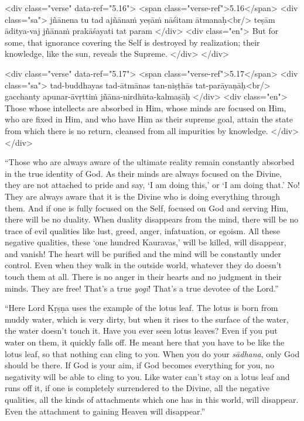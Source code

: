 \begin{html}
<div class="verse" data-ref="5.16">
  <span class="verse-ref">5.16</span>
  <div class="sa">
    jñānena tu tad ajñānaṁ yeṣāṁ nāśitam ātmanaḥ<br/>
    teṣām āditya-vaj jñānaṁ prakāśayati tat param
  </div>
  <div class="en">
    But for some, that ignorance covering the Self is destroyed by realization; their knowledge, like the sun, reveals the Supreme.
  </div>
</div>
\end{html}



\begin{html}
<div class="verse" data-ref="5.17">
  <span class="verse-ref">5.17</span>
  <div class="sa">
    tad-buddhayas tad-ātmānas tan-niṣṭhās tat-parāyaṇāḥ<br/>
    gacchanty apunar-āvṛttiṁ jñāna-nirdhūta-kalmaṣāḥ
  </div>
  <div class="en">
    Those whose intellects are absorbed in Him, whose minds are focused on Him, who are fixed in Him, and who have Him as their supreme goal, attain the state from which there is no return, cleansed from all impurities by knowledge.
  </div>
</div>
\end{html}




\enquote{Those who are always aware of the ultimate reality remain constantly absorbed in the true identity of God. As their minds are always focused on the Divine, they are not attached to pride and say, \enquote{I am doing this,} or \enquote{I am doing that.} No! They are always aware that it is the Divine who is doing everything through them. And if one is fully focused on the Self, focused on God and serving Him, there will be no duality. When duality disappears from the mind, there will be no trace of evil qualities like lust, greed, anger, infatuation, or egoism. All these negative qualities, these \enquote{one hundred Kauravas,} will be killed, will disappear, and vanish! The heart will be purified and the mind will be constantly under control. Even when they walk in the outside world, whatever they do doesn’t touch them at all. There is no anger in their hearts and no judgment in their minds. They are free! That’s a true \textit{yogī}! That’s a true devotee of the Lord.}

\enquote{Here Lord Kṛṣṇa uses the example of the lotus leaf. The lotus is born from muddy water, which is very dirty, but when it rises to the surface of the water, the water doesn’t touch it. Have you ever seen lotus leaves? Even if you put water on them, it quickly falls off. He meant here that you have to be like the lotus leaf, so that nothing can cling to you. When you do your \textit{sādhana}, only God should be there. If God is your aim, if God becomes everything for you, no negativity will be able to cling to you. Like water can’t stay on a lotus leaf and runs off it, if one is completely surrendered to the Divine, all the negative qualities, all the kinds of attachments which one has in this world, will disappear. Even the attachment to gaining Heaven will disappear.}

